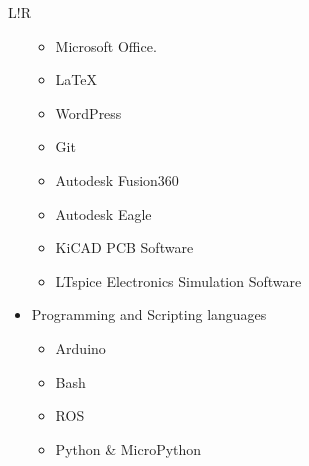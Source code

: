 \documentclass[a4paper]{article}
\newcommand\VRule{\color{lightgray}\vrule width 0.5pt}
\begin{document}
\begin{tabularx}{\textwidth}{L!{\VRule}R}
\begin{itemize}
\begin{itemize}
            \item Microsoft Office.
            \item LaTeX
            \item WordPress
            \item Git
            \item Autodesk Fusion360
            \item Autodesk Eagle
            \item KiCAD PCB Software
            \item LTspice Electronics Simulation Software
        \end{itemize}
        \item Programming and Scripting languages
        \begin{itemize}
            \item Arduino
            \item Bash
            \item ROS
            \item Python \& MicroPython
        \end{itemize}
    \end{itemize}
\end{tabularx}
\end{document}
